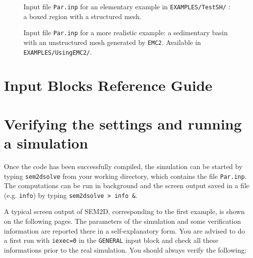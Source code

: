 \begin{figure}[p]
\caption{\label{Fig:ParInp1} Input file \texttt{Par.inp} for an
elementary example in \texttt{EXAMPLES/TestSH/}
: a boxed region with a structured mesh.}
\end{figure}

\begin{figure}[p]
\caption{\label{Fig:ParInp2} Input file \texttt{Par.inp} for a
more realistic example: a sedimentary basin with an unstructured mesh generated
by \texttt{EMC2}. Available in \texttt{EXAMPLES/UsingEMC2/}.}
\end{figure}
 
 \newpage
\section{Input Blocks Reference Guide}
\label{Sec:inblo}
%

 \newpage

\section{Verifying the settings and running a simulation}
\label{Sec:check}
 
Once the code has been successfully compiled, the simulation
can be started by typing \texttt{sem2dsolve} from your working directory, 
which contains the file \texttt{Par.inp}.
The computations can be run in background
and the screen output saved in a file (e.g. \texttt{info}) by typing
\texttt{sem2dsolve > info \&}.

A typical screen output of SEM2D, corresponding
to the first example, is shown on the following pages.
The parameters of the simulation 
and some verification information are reported there in a self-explanatory form. 
You are advised to
do a first run with \texttt{iexec=0} in the \texttt{GENERAL} input block
and check all these informations prior to the real simulation.
You should always verify the following:

